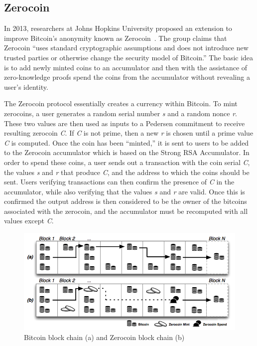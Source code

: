 \documentclass[11pt]{article}
\begin{document}
\subsection{Zerocoin}
In 2013, researchers at Johns Hopkins University proposed an extension to improve Bitcoin's anonymity known as
Zerocoin~\cite{miers13}. The group claims that Zerocoin ``uses standard cryptographic assumptions and does not introduce
new trusted parties or otherwise change the security model of Bitcoin.'' The basic idea is to add newly minted coins to
an accumulator and then with the assistance of zero-knowledge proofs spend the coins from the accumulator without
revealing a user's identity.

The Zerocoin protocol essentially creates a currency within Bitcoin. To mint zerocoins, a user generates a random serial
number \emph{s} and a random nonce \emph{r}. These two values are then used as inputs to a Pedersen commitment to
receive resulting zerocoin \emph{C}. If \emph{C} is not prime, then a new \emph{r} is chosen until a prime value
\emph{C} is computed. Once the coin has been ``minted,'' it is sent to users to be added to the Zerocoin accumulator
which is based on the Strong RSA Accumulator. In order to spend these coins, a user sends out a transaction with the
coin serial \emph{C}, the values \emph{s} and \emph{r} that produce \emph{C}, and the address to which the coins should
be sent. Users verifying transactions can then confirm the presence of \emph{C} in the accumulator, while also verifying
that the values \emph{s} and \emph{r} are valid. Once this is confirmed the output address is then considered to be the
owner of the bitcoins associated with the zerocoin, and the accumulator must be recomputed with all values except
\emph{C}.

\begin{figure}[H]
    \centering
    \caption[Bitcoin block chain (a) and Zerocoin block chain (b)]{Bitcoin block chain (a) and Zerocoin block chain (b)~\cite{miers13}}
    \includegraphics[width=\linewidth]{figures/zerocoin.png}
\end{figure}
\end{document}
